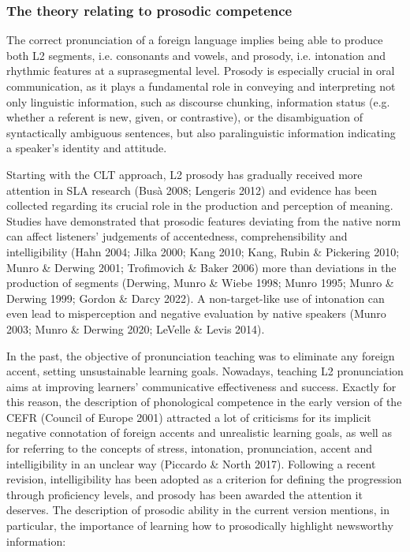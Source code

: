 \subsubsection[The theory relating to prosodic competence]{The theory relating to prosodic competence}
\hypertarget{Toc191305874}{}\begin{styleStandard}
The correct pronunciation of a foreign language implies being able to produce both L2 segments, i.e. consonants and vowels, and prosody, i.e. intonation and rhythmic features at a suprasegmental level. Prosody is especially crucial in oral communication, as it plays a fundamental role in conveying and interpreting not only linguistic information, such as discourse chunking, information status (e.g. whether a referent is new, given, or contrastive), or the disambiguation of syntactically ambiguous sentences, but also paralinguistic information indicating a speaker’s identity and attitude.
\end{styleStandard}

\begin{styleStandard}
Starting with the CLT approach, L2 prosody has gradually received more attention in SLA research (Busà 2008; Lengeris 2012) and evidence has been collected regarding its crucial role in the production and perception of meaning. Studies have demonstrated that prosodic features deviating from the native norm can affect listeners’ judgements of accentedness, comprehensibility and intelligibility (Hahn 2004; Jilka 2000; Kang 2010; Kang, Rubin \& Pickering 2010; Munro \& Derwing 2001; Trofimovich \& Baker 2006) more than deviations in the production of segments (Derwing, Munro \& Wiebe 1998; Munro 1995; Munro \& Derwing 1999; Gordon \& Darcy 2022). A non-target-like use of intonation can even lead to misperception and negative evaluation by native speakers (Munro 2003; Munro \& Derwing 2020; LeVelle \& Levis 2014).
\end{styleStandard}

\begin{styleStandard}
In the past, the objective of pronunciation teaching was to eliminate any foreign accent, setting unsustainable learning goals. Nowadays, teaching L2 pronunciation aims at improving learners’ communicative effectiveness and success. Exactly for this reason, the description of phonological competence in the early version of the CEFR (Council of Europe 2001) attracted a lot of criticisms for its implicit negative connotation of foreign accents and unrealistic learning goals, as well as for referring to the concepts of stress, intonation, pronunciation, accent and intelligibility in an unclear way (Piccardo \& North 2017). Following a recent revision, intelligibility has been adopted as a criterion for defining the progression through proficiency levels, and prosody has been awarded the attention it deserves. The description of prosodic ability in the current version mentions, in particular, the importance of learning how to prosodically highlight newsworthy information:
\end{styleStandard}

